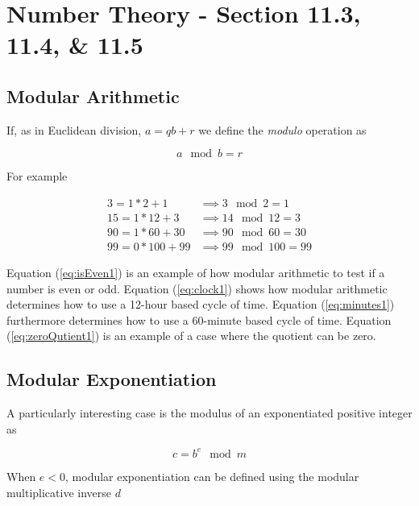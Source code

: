 \documentclass{article}
\renewcommand{\_}{\ifincsname_\else\legacyunderscore\fi}
\begin{document}
    \newpage
\section{Number Theory - Section 11.3, 11.4, \& 11.5}
    \subsection{Modular Arithmetic}

        If, as in Euclidean division, $a = q b + r$ we define the \emph{modulo} operation as

        \begin{equation}
            a \mod b = r
        \end{equation}

        For example

        \begin{align}
            \label{eq:isEven1}      3  = 1 * 2   + 1  &\implies 3  \mod 2   = 1 \\
            \label{eq:clock1}       15 = 1 * 12  + 3  &\implies 14 \mod 12  = 3 \\
            \label{eq:minutes1}     90 = 1 * 60  + 30 &\implies 90 \mod 60  = 30 \\
            \label{eq:zeroQutient1} 99 = 0 * 100 + 99 &\implies 99 \mod 100 = 99
        \end{align}

        Equation (\ref{eq:isEven1}) is an example of how modular arithmetic to test if a number is even or odd.  Equation (\ref{eq:clock1}) shows how modular arithmetic determines how to use a 12-hour based cycle of time.  Equation (\ref{eq:minutes1}) furthermore determines how to use a 60-minute based cycle of time.  Equation (\ref{eq:zeroQutient1}) is an example of a case where the quotient can be zero.

        \subsection{Modular Exponentiation}

        A particularly interesting case is the modulus of an exponentiated positive integer as

        \begin{equation}
            c = b^e \mod m
        \end{equation}

        When $e < 0$, modular exponentiation can be defined using the modular multiplicative inverse $d$
\end{document}

